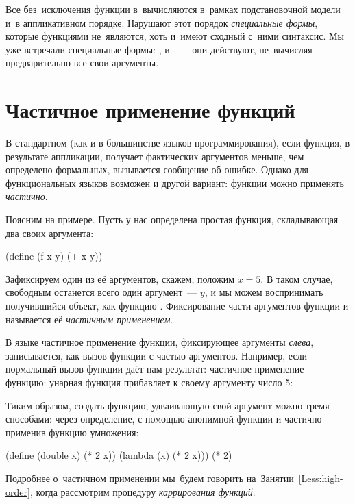 Все без~исключения функции в~\Scheme вычисляются в~рамках подстановочной модели и~в аппликативном порядке. Нарушают этот порядок \emph{специальные формы}, которые функциями не~являются, хоть и~имеют сходный с~ними синтаксис. Мы уже встречали специальные формы: ,  и~~--- они действуют, не~вычисляя предварительно все свои аргументы.

\section[4]{Частичное применение функций}%
В стандартном \Racket (как и в большинстве языков программирования), если функция, в результате аппликации, получает фактических аргументов меньше, чем определено формальных, вызывается сообщение об ошибке. Однако для функциональных языков возможен и другой вариант: функции можно применять \emph{частично}.

Поясним на примере. Пусть у нас определена простая функция, складывающая два своих аргумента:

\begin{Definition}[emph={x,y}]
  (define (f x y)
    (+ x y))
\end{Definition}
\newpage

Зафиксируем один из её аргументов, скажем, положим $x = 5$. В таком случае, свободным останется всего один аргумент~--- $y$, и мы можем воспринимать получившийся объект, как функцию . Фиксирование части аргументов функции и называется её \emph{частичным применением}.

В языке \Scheme частичное применение функции, фиксирующее аргументы \emph{слева}, записывается, как вызов функции с частью аргументов. Например, если нормальный вызов функции даёт нам результат:
 частичное применение --- функцию:
 унарная функция  прибавляет к своему аргументу число 5:

Тиким образом, создать функцию, удваивающую свой аргумент можно тремя способами: через определение, с помощью анонимной функции и частично применив функцию умножения:
\begin{SchemeCode}
  (define (double x) (* 2 x))
  (lambda (x) (* 2 x)))
  (* 2)
\end{SchemeCode}

Подробнее о~частичном применении мы~будем говорить на~Занятии~\ref{Less:high-order}, когда рассмотрим процедуру \emph{каррирования функций}.

